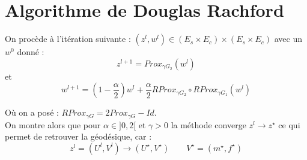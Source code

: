 \documentclass[a4paper,12pt]{article}
\begin{document}
\section{Algorithme de Douglas Rachford}
On procède à l'itération suivante : $(z^l,w^l)\in (E_s\times E_c)\times (E_s\times E_c)$ avec un $w^0$ donné : 
$$
z^{l+1}=Prox_{\gamma G_2} (w^l)
$$
et 
$$
w^{l+1}=(1-\frac{\alpha}{2})w^l + \frac{\alpha}{2}RProx_{\gamma G_2}\circ RProx_{\gamma G_1} (w^l)
$$

Où on a posé : $RProx_{\gamma G} = 2Prox_{\gamma G}-Id$.\\
On montre alors que pour $\alpha\in ]0,2[$ et $\gamma>0$ la méthode converge $z^l\rightarrow z^{\star}$ ce qui permet de retrouver la géodésique, car : 
$$
z^l=(U^l,V^l)\rightarrow (U^{\star},V^{\star}) \qquad V^{\star}=(m^{\star},f^{\star})
$$





\newpage


\newpage
\end{document}
